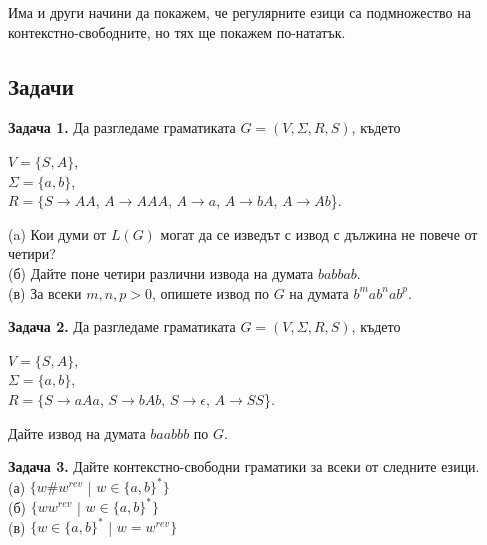 \documentclass[openany]{book}
\begin{document}
    Има и други начини да покажем, че регулярните езици са подмножество
    на контекстно-свободните, но тях ще покажем по-нататък.


\vspace{25pt}

\subsection{Задачи}
    \textbf{Задача 1.} Да разгледаме граматиката $G = (V,\Sigma,R,S)$, където
    \vspace{5pt}
    \begin{center}
        $V = \{S,A\}$, \\
        $\Sigma = \{a,b\}$, \\
        $R = \{S \rightarrow AA$, $A \rightarrow AAA$, $A \rightarrow a$, $A \rightarrow bA$, $A \rightarrow Ab$\}. \\
    \end{center}
    \vspace{5pt}
    (a) Кои думи от $L(G)$ могат да се изведът с извод с дължина не повече от четири? \\
    (б) Дайте поне четири различни извода на думата $babbab$. \\
    (в) За всеки $m,n,p > 0$, опишете извод по $G$ на думата $b^mab^nab^p$. 

    \vspace{15pt}

    \textbf{Задача 2.} Да разгледаме граматиката $G = (V,\Sigma,R,S)$, където
    \vspace{5pt}
    \begin{center}
        $V = \{S,A\}$, \\
        $\Sigma = \{a,b\}$, \\
        $R = \{S \rightarrow aAa$, $S \rightarrow bAb$, $S \rightarrow \epsilon$, $A \rightarrow SS$\}. \\
    \end{center}
    Дайте извод на думата $baabbb$ по $G$.

    \vspace{15pt}

    \textbf{Задача 3.} Дайте контекстно-свободни граматики за всеки от следните езици. \\
    (а) $\{w\#w^{rev}$ | $w \in \{a,b\}^*\}$ \\
    (б) $\{ww^{rev}$ | $w \in \{a,b\}^*\}$ \\
    (в) $\{w \in \{a,b\}^*$ | $w = w^{rev}\}$
\end{document}
